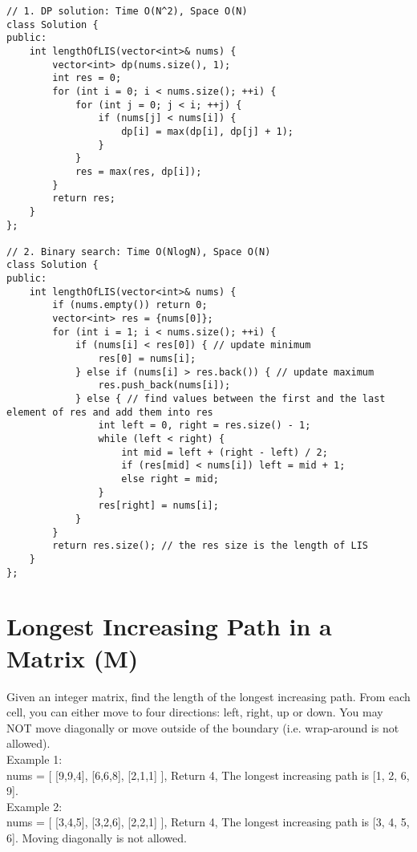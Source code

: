 \begin{lstlisting}
// 1. DP solution: Time O(N^2), Space O(N)
class Solution {
public:
    int lengthOfLIS(vector<int>& nums) {
        vector<int> dp(nums.size(), 1);
        int res = 0;
        for (int i = 0; i < nums.size(); ++i) {
            for (int j = 0; j < i; ++j) {
                if (nums[j] < nums[i]) {
                    dp[i] = max(dp[i], dp[j] + 1);
                }
            }
            res = max(res, dp[i]);
        }
        return res;
    }
};

// 2. Binary search: Time O(NlogN), Space O(N)
class Solution {
public:
    int lengthOfLIS(vector<int>& nums) {
        if (nums.empty()) return 0;
        vector<int> res = {nums[0]};
        for (int i = 1; i < nums.size(); ++i) {
            if (nums[i] < res[0]) { // update minimum
                res[0] = nums[i];
            } else if (nums[i] > res.back()) { // update maximum
                res.push_back(nums[i]);
            } else { // find values between the first and the last element of res and add them into res
                int left = 0, right = res.size() - 1;
                while (left < right) {
                    int mid = left + (right - left) / 2;
                    if (res[mid] < nums[i]) left = mid + 1;
                    else right = mid;
                }
                res[right] = nums[i];
            }
        }
        return res.size(); // the res size is the length of LIS
    }
};
\end{lstlisting}


\section{Longest Increasing Path in a Matrix (M)}
Given an integer matrix, find the length of the longest increasing path. From each cell, you can either move to four directions: left, right, up or down. You may NOT move diagonally or move outside of the boundary (i.e. wrap-around is not allowed).\\

Example 1:\\
nums = [
  [9,9,4],
  [6,6,8],
  [2,1,1]
],
Return 4,
The longest increasing path is [1, 2, 6, 9].\\

Example 2:\\
nums = [
  [3,4,5],
  [3,2,6],
  [2,2,1]
],
Return 4,
The longest increasing path is [3, 4, 5, 6]. Moving diagonally is not allowed.\\

